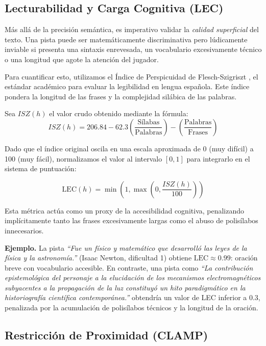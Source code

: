 \documentclass[../main.tex]{subfiles}
\begin{document}
\subsection{Lecturabilidad y Carga Cognitiva (LEC)}
Más allá de la precisión semántica, es imperativo validar la \textit{calidad superficial} del texto. Una pista puede ser matemáticamente discriminativa pero lúdicamente inviable si presenta una sintaxis enrevesada, un vocabulario excesivamente técnico o una longitud que agote la atención del jugador.

Para cuantificar esto, utilizamos el Índice de Perspicuidad de Flesch-Szigriszt \cite{szigriszt1993sistemas}, el estándar académico para evaluar la legibilidad en lengua española. Este índice pondera la longitud de las frases y la complejidad silábica de las palabras.

Sea $ISZ(h)$ el valor crudo obtenido mediante la fórmula:
\begin{equation}
    ISZ(h) = 206.84 - 62.3 \left( \frac{\text{Sílabas}}{\text{Palabras}} \right) - \left( \frac{\text{Palabras}}{\text{Frases}} \right)
\end{equation}

Dado que el índice original oscila en una escala aproximada de 0 (muy difícil) a 100 (muy fácil), normalizamos el valor al intervalo $[0, 1]$ para integrarlo en el sistema de puntuación:

\begin{equation}
    \text{LEC}(h) = \min\left(1, \max\left(0, \frac{ISZ(h)}{100}\right)\right)
\end{equation}

Esta métrica actúa como un proxy de la accesibilidad cognitiva, penalizando implícitamente tanto las frases excesivamente largas como el abuso de polisílabos innecesarios.

\medskip
\textbf{Ejemplo.} La pista \textit{``Fue un físico y matemático que desarrolló las leyes de la física y la astronomía.''} (Isaac Newton, dificultad 1) obtiene $\text{LEC} \approx 0.99$: oración breve con vocabulario accesible. En contraste, una pista como \textit{``La contribución epistemológica del personaje a la elucidación de los mecanismos electromagnéticos subyacentes a la propagación de la luz constituyó un hito paradigmático en la historiografía científica contemporánea.''} obtendría un valor de LEC inferior a 0.3, penalizada por la acumulación de polisílabos técnicos y la longitud de la oración.

\subsection{Restricción de Proximidad (CLAMP)}
\end{document}
